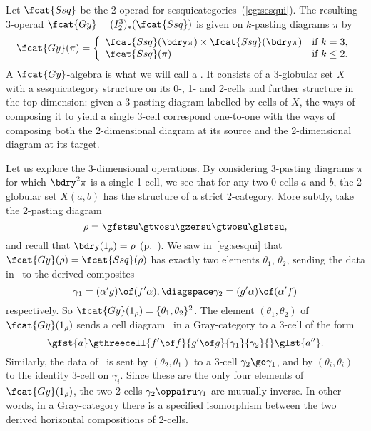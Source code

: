 \begin{example}	
Let $\fcat{Ssq}$ be the 2-operad for sesquicategories~(\ref{eg:sesqui}).%
%
%
The resulting 3-operad $\fcat{Gy} = (I^3_2)_* (\fcat{Ssq})$ is given on
$k$-pasting diagrams $\pi$ by
\[
\fcat{Gy}(\pi)
=
\left\{
\begin{array}{ll}
\fcat{Ssq}(\bdry\pi) \times \fcat{Ssq}(\bdry\pi)	&
\textrm{if } k=3,	\\
\fcat{Ssq}(\pi)		&
\textrm{if } k\leq 2.
\end{array}
\right.
\]
A $\fcat{Gy}$-algebra is what we will call a .%
%
%
 It
consists of a 3-globular set $X$ with a sesquicategory structure on its 0-,
1- and 2-cells and further structure in the top dimension: given a
3-pasting diagram labelled by cells of $X$, the ways of composing it to
yield a single 3-cell correspond one-to-one with the ways of composing both
the 2-dimensional diagram at its source and the 2-dimensional diagram at
its target.  

Let us explore the 3-dimensional operations.  By considering 3-pasting
diagrams $\pi$ for which $\bdry^2\pi$ is a single 1-cell, we see that for
any two 0-cells $a$ and $b$, the 2-globular set $X(a,b)$ has the structure
of a strict 2-category.  More subtly, take the 2-pasting diagram
\[
\rho 
=
\gfstsu\gtwosu\gzersu\gtwosu\glstsu,%
%
\index{composition!horizontal}
%
\]
and recall that $\bdry(1_\rho) = \rho$ (p.~\pageref{p:bdry-degen-pd}).  We
saw in~\ref{eg:sesqui} that $\fcat{Gy}(\rho) = \fcat{Ssq}(\rho)$
has exactly two elements $\theta_1$, $\theta_2$, sending the data
in~ to the derived composites
\[
\gamma_1 = (\alpha' g) \of (f' \alpha),
\diagspace
\gamma_2 = (g' \alpha) \of (\alpha' f) 
\]
respectively.  So $\fcat{Gy}(1_\rho) = \{ \theta_1, \theta_2 \}^2$.  The
element $(\theta_1, \theta_2)$ of $\fcat{Gy}(1_\rho)$ sends a cell
diagram~ in a Gray-category to a 3-cell of the form
\[
\gfst{a}
\gthreecell{f'\of f}{g'\of g}{\gamma_1}{\gamma_2}{}
\glst{a''}.
\]
Similarly, the data of~ is sent by $(\theta_2,
\theta_1)$ to a 3-cell $\gamma_2 \go \gamma_1$, and by $(\theta_i,
\theta_i)$ to the identity 3-cell on $\gamma_i$.  Since these are the only
four elements of $\fcat{Gy}(1_\rho)$, the two 2-cells $\gamma_2 \oppairu
\gamma_1$ are mutually inverse.  In other words, in a Gray-category there
is a specified isomorphism between the two derived horizontal
compositions
of 2-cells.


\end{example}
